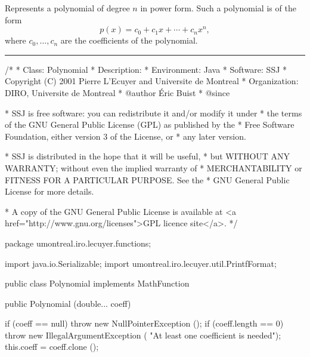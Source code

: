 
Represents a polynomial of degree $n$ in power form. Such a polynomial is of
the form
\begin{equation}
p(x) = c_0 + c_1x + \cdots + c_nx^n,
\end{equation}
where $c_0, \ldots, c_n$ are the coefficients of the polynomial.

\bigskip\hrule

\begin{code}
\begin{hide}
/*
 * Class:        Polynomial
 * Description:
 * Environment:  Java
 * Software:     SSJ
 * Copyright (C) 2001  Pierre L'Ecuyer and Universite de Montreal
 * Organization: DIRO, Universite de Montreal
 * @author       Éric Buist
 * @since

 * SSJ is free software: you can redistribute it and/or modify it under
 * the terms of the GNU General Public License (GPL) as published by the
 * Free Software Foundation, either version 3 of the License, or
 * any later version.

 * SSJ is distributed in the hope that it will be useful,
 * but WITHOUT ANY WARRANTY; without even the implied warranty of
 * MERCHANTABILITY or FITNESS FOR A PARTICULAR PURPOSE.  See the
 * GNU General Public License for more details.

 * A copy of the GNU General Public License is available at
   <a href="http://www.gnu.org/licenses">GPL licence site</a>.
 */
\end{hide}
package umontreal.iro.lecuyer.functions;\begin{hide}

import java.io.Serializable;
import umontreal.iro.lecuyer.util.PrintfFormat;
\end{hide}

public class Polynomial implements MathFunction\begin{hide}
,
      MathFunctionWithFirstDerivative, MathFunctionWithDerivative,
      MathFunctionWithIntegral, Serializable, Cloneable {
   private static final long serialVersionUID = -2911550952861456470L;
   private double[] coeff;
\end{hide}

   public Polynomial (double... coeff)\begin{hide} {
      if (coeff == null)
         throw new NullPointerException ();
      if (coeff.length == 0)
         throw new IllegalArgumentException (
               "At least one coefficient is needed");
      this.coeff = coeff.clone ();
   }\end{hide}
\end{code}
